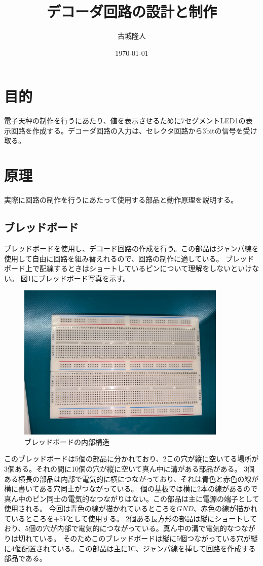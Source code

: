 \documentclass[a4paper,11pt,dvipdfmx]{jsarticle}
\begin{document}
\title{デコーダ回路の設計と制作}
\author{古城隆人}
\date{\today}
\maketitle

\newpage
\section{目的}
電子天秤の制作を行うにあたり、値を表示させるために7セグメントLED1の表示回路を作成する。デコーダ回路の入力は、セレクタ回路から3bitの信号を受け取る。
\section{原理}
実際に回路の制作を行うにあたって使用する部品と動作原理を説明する。
\subsection{ブレッドボード}
ブレッドボードを使用し、デコード回路の作成を行う。この部品はジャンパ線を使用して自由に回路を組み替えれるので、回路の制作に適している。
ブレッドボード上で配線するときはショートしているピンについて理解をしないといけない。
図\ref{fig:breadboard}にブレッドボード写真を示す。
\begin{figure}[h]
  \centering
  \includegraphics[width=10cm]{./images/breadboard.jpg}
  \caption{ブレッドボードの内部構造}
  \label{fig:breadboard}
\end{figure}
このブレッドボードは5個の部品に分かれており、2この穴が縦に空いてる場所が3個ある。それの間に10個の穴が縦に空いて真ん中に溝がある部品がある。
3個ある横長の部品は内部で電気的に横につながっており、それは青色と赤色の線が横に書いてある穴同士がつながっている。
個の基板では横に2本の線があるので真ん中のピン同士の電気的なつながりはない。この部品は主に電源の端子として使用される。
今回は青色の線が描かれているところを$GND$、赤色の線が描かれているところを$+5V$として使用する。
2個ある長方形の部品は縦にショートしており、5個の穴が内部で電気的につながっている。真ん中の溝で電気的なつながりは切れている。
そのためこのブレッドボードは縦に5個つながっている穴が縦に4個配置されている。この部品は主にIC、ジャンパ線を挿して回路を作成する部品である。
\end{document}
